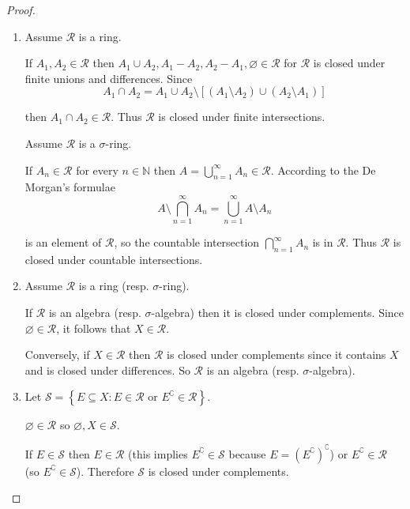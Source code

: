 \begin{proof}
    \begin{enumerate}[itemsep=0pt,label=\textbf{\alph*.}]
        \item Assume \( \mathcal{R} \) is a ring.

              If \( A_{1}, A_{2} \in \mathcal{R} \) then \( A_{1} \cup A_{2}, A_{1} - A_{2}, A_{2} - A_{1}, \varnothing \in \mathcal{R} \) for \( \mathcal{R} \) is closed under finite unions and differences. Since
              \[
                  A_{1} \cap A_{2} = A_{1} \cup A_{2} \setminus [(A_{1} \setminus A_{2}) \cup (A_{2} \setminus A_{1})]
              \]

              then \( A_{1} \cap A_{2} \in \mathcal{R} \). Thus \( \mathcal{R} \) is closed under finite intersections.

              Assume \( \mathcal{R} \) is a \( \sigma \)-ring.

              If \( A_{n} \in \mathcal{R} \) for every \( n \in \mathbb{N} \) then \( A = \bigcup_{n=1}^{\infty} A_{n} \in \mathcal{R} \). According to the De Morgan's formulae
              \[
                  A \setminus \bigcap_{n=1}^{\infty} A_{n} = \bigcup_{n=1}^{\infty} A \setminus A_{n}
              \]

              is an element of \( \mathcal{R} \), so the countable intersection \( \bigcap_{n=1}^{\infty} A_{n} \) is in \( \mathcal{R} \). Thus \( \mathcal{R} \) is closed under countable intersections.
        \item Assume \( \mathcal{R} \) is a ring (resp\@. \(\sigma\)-ring).

              If \( \mathcal{R} \) is an algebra (resp\@. \(\sigma\)-algebra) then it is closed under complements. Since \( \varnothing \in \mathcal{R} \), it follows that \( X \in \mathcal{R} \).

              Conversely, if \( X \in \mathcal{R} \) then \( \mathcal{R} \) is closed under complements since it contains \( X \) and is closed under differences. So \( \mathcal{R} \) is an algebra (resp\@. \(\sigma\)-algebra).
        \item Let \( \mathcal{S} = \left\{ E \subseteq X : E \in \mathcal{R} \text{ or } E^{\complement} \in \mathcal{R} \right\} \).

              \( \varnothing \in \mathcal{R} \) so \( \varnothing, X \in \mathcal{S} \).

              If \( E \in \mathcal{S} \) then \( E \in \mathcal{R} \) (this implies \( E^{\complement} \in \mathcal{S} \) because \( E = {(E^{\complement})}^{\complement} \)) or \( E^{\complement} \in \mathcal{R} \) (so \( E^{\complement} \in \mathcal{S} \)). Therefore \( \mathcal{S} \) is closed under complements.


\end{enumerate}
\end{proof}
